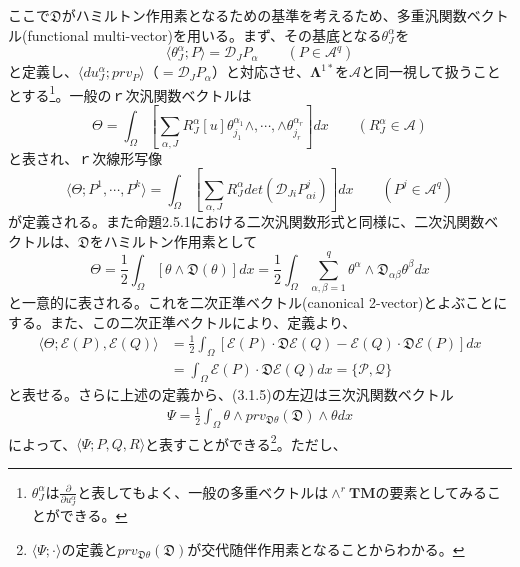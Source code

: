 \documentclass[a4paper, 11pt]{report}
\theoremstyle{definition}
\begin{document}
 ここで$\mathfrak{D}$がハミルトン作用素となるための基準を考えるため、多重汎関数ベクトル(functional multi-vector)を用いる。まず、その基底となる$\theta_J^\alpha$を
\begin{equation*}
\langle \theta_J^\alpha ;P\rangle = \mathcal{D}_JP_\alpha \qquad (P\in\mathcal{A}^q)
\end{equation*}
と定義し、$\langle du_J^\alpha ;prv_P\rangle$（$=\mathcal{D}_JP_\alpha$）と対応させ、$\mathbf{\Lambda} ^{1*}$を$\mathcal{A}$と同一視して扱うこととする\footnote{$\theta_J^\alpha$は$\frac{\partial}{\partial u_J^\alpha}$と表してもよく、一般の多重ベクトルは${\wedge}^r\mathbf{TM}$の要素としてみることができる。}。一般のｒ次汎関数ベクトルは
\begin{equation}
\Theta = \int_\Omega [\sum_{\alpha ,J}R_J^\alpha [u]\theta_{j_1}^{\alpha _1}\wedge ,\cdots ,\wedge \theta_{j_r}^{\alpha _r}]dx \qquad (R_J^\alpha\in\mathcal{A})  %
\end{equation}
と表され、ｒ次線形写像
\begin{equation*}
\langle \Theta ;P^1,\cdots,P^k \rangle = \int_\Omega [\sum_{\alpha ,J}R_J^\alpha det(\mathcal{D}_{Ji}P_{\alpha i}^j)]dx \qquad (P^j\in\mathcal{A}^q)
\end{equation*}
が定義される。また命題2.5.1における二次汎関数形式と同様に、二次汎関数ベクトルは、$\mathfrak{D}$をハミルトン作用素として
\begin{equation}
\Theta = \frac{1}{2}\int_\Omega [\theta\wedge\mathfrak{D}(\theta )]dx = \frac{1}{2}\int_\Omega \sum_{\alpha ,\beta =1}^q\theta ^\alpha\wedge\mathfrak{D}_{\alpha\beta}\theta ^\beta dx  %
\end{equation}
と一意的に表される。これを二次正準ベクトル(canonical 2-vector)とよぶことにする。また、この二次正準ベクトルにより、定義より、
\begin{align*}
\langle \Theta ;\mathcal{E}(P),\mathcal{E}(Q)\rangle &= \frac{1}{2}\int_\Omega [\mathcal{E}(P)\cdot\mathfrak{D}\mathcal{E}(Q)-\mathcal{E}(Q)\cdot\mathfrak{D}\mathcal{E}(P)]dx\\
&= \int_\Omega \mathcal{E}(P)\cdot\mathfrak{D}\mathcal{E}(Q)dx = \{ \mathcal{P}, \mathcal{Q} \}
\end{align*}
と表せる。さらに上述の定義から、(3.1.5)の左辺は三次汎関数ベクトル
\begin{align*}
\Psi = \frac{1}{2}\int_\Omega \theta\wedge prv_{\mathfrak{D}\theta}(\mathfrak{D})\wedge\theta dx
\end{align*}
によって、$\langle\Psi ;P,Q,R\rangle$と表すことができる\footnote{$\langle\Psi ;\cdot\rangle$の定義と$prv_{\mathfrak{D}\theta}(\mathfrak{D})$が交代随伴作用素となることからわかる。}。ただし、
\end{document}

